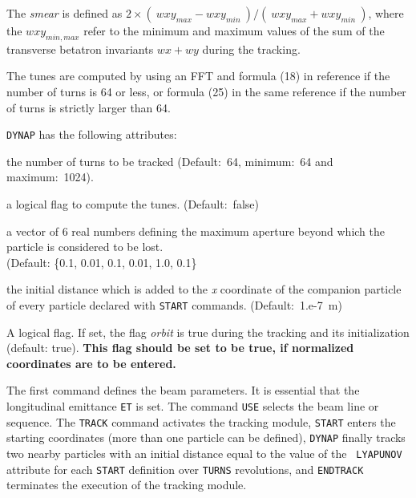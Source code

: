 The \textit{smear} is defined as  
$2 \times (\ wxy_{max} - wxy_{min}\ ) / (\ wxy_{max} + wxy_{min}\ )$,
where the $wxy_{min,max}$ refer to the  minimum and
maximum values of the sum of the transverse betatron invariants
$wx+wy$ during the tracking. 

The tunes are computed by using an FFT and formula (18) in reference 
\cite{bartolini1995} if the number of turns is 64 or less, or formula (25) in 
the same reference if the number of turns is strictly larger than 64.
 
\texttt{DYNAP} has the following attributes: 
\begin{madlist}
    the number of turns to be tracked (Default:~64,
   minimum:~64 and maximum:~1024). 
     
    a logical flag to compute the tunes. (Default:~false)
 
    a vector of 6 real numbers defining the maximum
   aperture beyond which the particle is considered to be lost.\\
   (Default: \{0.1, 0.01, 0.1, 0.01, 1.0, 0.1\}
     
    the initial distance which is added to the
   \textit{x} coordinate of the companion particle of every particle
   declared with \texttt{START} commands. (Default:~1.e-7~m)
   
    A logical flag. If set, the flag \textit{orbit} 
   is true during the tracking and its initialization
   (default: true).
   \textbf{This flag should be set to be true, if 
     normalized coordinates are to be entered.}
\end{madlist}


The first command defines the beam parameters. It is  essential that the
longitudinal emittance \texttt{ET} is set. The command \texttt{USE}
selects the beam line or sequence. The \texttt{TRACK} command activates the
tracking module, \texttt{START} enters the starting coordinates (more
than one particle can be defined),  \texttt{DYNAP} finally tracks two
nearby particles  with an initial distance equal to the value of the \texttt{
LYAPUNOV} attribute  for each
\texttt{START} definition over \texttt{TURNS} revolutions, and
\texttt{ENDTRACK} terminates the execution of the tracking module. 

